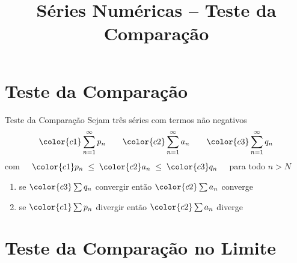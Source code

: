 \documentclass[fleqn,utf8,aspectratio=169,12pt]{beamer}
\title{Séries Numéricas -- Teste da Comparação}
\begin{document}
\addtitle

\section{Teste da Comparação}

\begin{frame}{Teste da Comparação}
  Sejam três séries com termos não negativos
  \[
    {\color{c1} \sum_{n=1}^{\infty} p_n} \qquad
    {\color{c2} \sum_{n=1}^{\infty} a_n} \qquad
    {\color{c3} \sum_{n=1}^{\infty} q_n}
  \]
  com \( \quad {\color{c1}p_n} \;\leq\; {\color{c2}a_n} \;\leq\; {\color{c3}q_n} \quad \) para todo $n>N$

  \pause
  \bigskip
  \begin{enumerate}
    \item se \tabto{8mm} \(\color{c3} \sum q_n \) convergir \tabto{40mm} então  \(\color{c2} \sum a_n \) converge \\[6mm]\pause
    \item se \tabto{8mm} \(\color{c1} \sum p_n \) divergir  \tabto{40mm} então  \(\color{c2} \sum a_n \) diverge
  \end{enumerate}
\end{frame}



\section{Teste da Comparação no Limite}
\end{document}
